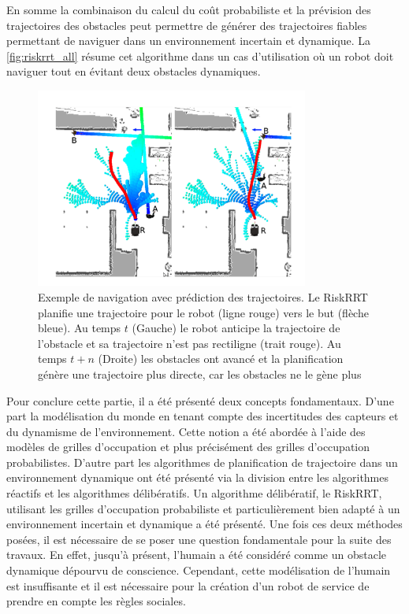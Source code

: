En somme la combinaison du calcul du coût probabiliste et la prévision des trajectoires des obstacles peut permettre de générer des trajectoires fiables permettant de naviguer dans un environnement incertain et dynamique. La \autoref{fig:riskrrt_all} résume cet algorithme dans un cas d'utilisation où un robot doit naviguer tout en évitant deux obstacles dynamiques.

\begin{figure}[H]
    \centering
    \includegraphics[width=0.8\textwidth]{Rapport/images/riskrrt_all.png}
    \caption{Exemple de navigation avec prédiction des trajectoires. Le RiskRRT planifie une trajectoire pour le robot (ligne rouge) vers le but (flèche bleue). Au temps $t$ (Gauche) le robot anticipe la trajectoire de l'obstacle et sa trajectoire n'est pas rectiligne (trait rouge). Au temps $t+n$ (Droite) les obstacles ont avancé et la planification génère une trajectoire plus directe, car les obstacles ne le gène plus}
    \label{fig:riskrrt_all}
\end{figure}

Pour conclure cette partie, il a été présenté deux concepts fondamentaux. D'une part la modélisation du monde en tenant compte des incertitudes des capteurs et du dynamisme de l'environnement. Cette notion a été abordée à l'aide des modèles de grilles d'occupation et plus précisément des grilles d'occupation probabilistes. D'autre part les algorithmes de planification de trajectoire dans un environnement dynamique ont été présenté via la division entre les algorithmes réactifs et les algorithmes délibératifs. Un algorithme délibératif, le RiskRRT, utilisant les grilles d'occupation probabiliste et particulièrement bien adapté à un environnement incertain et dynamique a été présenté. Une fois ces deux méthodes posées, il est nécessaire de se poser une question fondamentale pour la suite des travaux. En effet, jusqu'à présent, l'humain a été considéré comme un obstacle dynamique dépourvu de conscience. Cependant, cette modélisation de l'humain est insuffisante et il est nécessaire pour la création d'un robot de service de prendre en compte les règles sociales.

